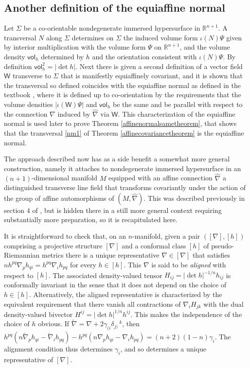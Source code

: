 \documentclass [leqno, 10pt]{amsart}
\theoremstyle{definition}
\numberwithin{equation}{section}
\newcommand{\imt}{\iota}
\newcommand{\vol}{\mathsf{vol}}
\newcommand{\nm}{\mathsf{W}}
\newcommand{\en}{[\nabla]}
\newcommand{\ga}{\gamma}
\newcommand{\hnabla}{\widehat{\nabla}}
\newcommand{\tnabla}{\tilde{\nabla}}
\newcommand{\rea}{\mathbb R}
\begin{document}
\subsection{Another definition of the equiaffine normal}\label{affinesection}
Let $\Sigma$ be a co-orientable nondegenerate immersed hypersurface in $\rea^{n+1}$. A transversal $N$ along $\Sigma$ determines on $\Sigma$ the induced volume form $\imt(N)\Psi$ given by interior multiplication with the volume form $\Psi$ on $\rea^{n+1}$, and the volume density $\vol_{h}$ determined by $h$ and the orientation consistent with $\imt(N)\Psi$. By definition $\vol_{h}^{2} = |\det h|$. Next there is given a second definition of a vector field $\nm$ transverse to $\Sigma$ that is manifestly equiaffinely covariant, and it is shown that the transversal so defined coincides with the equiaffine normal as defined in the textbook \cite{Nomizu-Sasaki}, where it is defined up to co-orientation by the requirements that the volume densities $|\imt(\nm)\Psi|$ and $\vol_{h}$ be the same and be parallel with respect to the connection $\nabla$ induced by $\hnabla$ via $\nm$. This characterization of the equiaffine normal is used later to prove Theorem \ref{affinenormalsametheorem}, that shows that the transversal \eqref{nm1} of Theorem \ref{affinecovariancetheorem} is the equiaffine normal.

The approach described now has as a side benefit a somewhat more general construction, namely it attaches to nondegenerate immersed hypersurface in an $(n+1)$-dimensional manifold $M$ equipped with an affine connection $\hnabla$ a distinguished transverse line field that transforms covariantly under the action of the group of affine automorphisms of $(M, \hnabla)$. 
This was described previously in section $4$ of \cite{Fox-ahs}, but is hidden there in a still more general context requiring substantially more preparation, so it is recapitulated here.
 
It is straightforward to check that, on an $n$-manifold, given a pair $(\en, [h])$ comprising a projective structure $\en$ and a conformal class $[h]$ of pseudo-Riemannian metrics there is a unique representative $\nabla \in \en$ that satisfies $nh^{pq}\nabla_{p}h_{qi} = h^{pq}\nabla_{i}h_{pq}$ for every $h \in [h]$. This $\nabla$ is said to be \textit{aligned} with respect to $[h]$. The associated density-valued tensor $H_{ij} = |\det h|^{-1/n}h_{ij}$ is conformally invariant in the sense that it does not depend on the choice of $h \in [h]$. Alternatively, the aligned representative is characterized by the equivalent requirement that there vanish all contractions of $\nabla_{i}H_{jk}$ with the dual density-valued bivector $H^{ij} = |\det h|^{1/n}h^{ij}$. This makes the independence of the choice of $h$ obvious. If $\tnabla = \nabla + 2\ga_{(i}\delta_{j)}\,^{k}$, then $h^{pq}(n\tnabla_{p}h_{qi} - \tnabla_{i}h_{pq}) - h^{pq}(n\nabla_{p}h_{qi} - \nabla_{i}h_{pq}) = (n+2)(1-n)\ga_{i}$. The alignment condition thus determines $\ga_{i}$, and so determines a unique representative of $\en$.
\end{document}
